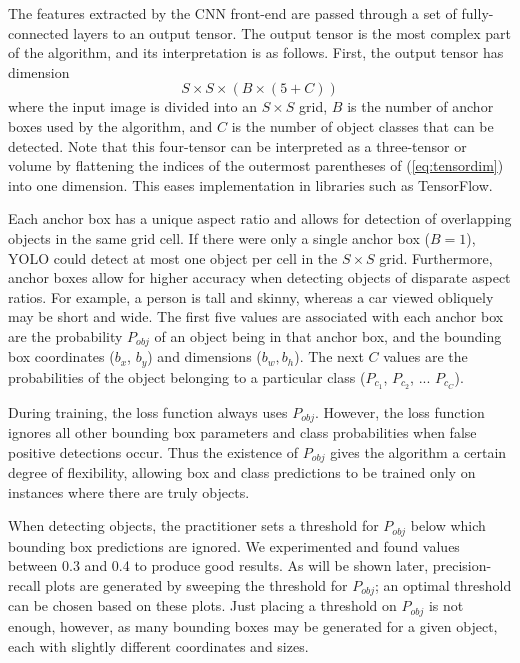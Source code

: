 \documentclass{article}
\begin{document}
The features extracted by the CNN front-end are passed through a set of fully-connected layers to an output tensor. The output tensor is the most complex part of the algorithm, and its interpretation is as follows. First, the output tensor has dimension
\begin{equation}
    S \times S \times (B \times (5 + C))
    \label{eq:tensordim}
\end{equation}
where the input image is divided into an $S \times S$ grid, $B$ is the number of anchor boxes used by the algorithm, and $C$ is the number of object classes that can be detected. Note that this four-tensor can be interpreted as a three-tensor or volume by flattening the indices of the outermost parentheses of (\ref{eq:tensordim}) into one dimension. This eases implementation in libraries such as TensorFlow.

Each anchor box has a unique aspect ratio and allows for detection of overlapping objects in the same grid cell. If there were only a single anchor box ($B=1$), YOLO could detect at most one object per cell in the $S \times S$ grid. Furthermore, anchor boxes allow for higher accuracy when detecting objects of disparate aspect ratios. For example, a person is tall and skinny, whereas a car viewed obliquely may be short and wide. The first five values are associated with each anchor box are the probability $P_{obj}$ of an object being in that anchor box, and the bounding box coordinates ($b_x$, $b_y$) and dimensions ($b_w, b_h$). The next $C$ values are the probabilities of the object belonging to a particular class ($P_{c_1}$, $P_{c_2}$, ... $P_{c_C}$).

During training, the loss function always uses $P_{obj}$. However, the loss function ignores all other bounding box parameters and class probabilities when false positive detections occur. Thus the existence of $P_{obj}$ gives the algorithm a certain degree of flexibility, allowing box and class predictions to be trained only on instances where there are truly objects.

When detecting objects, the practitioner sets a threshold for $P_{obj}$ below which bounding box predictions are ignored. We experimented and found values between 0.3 and 0.4 to produce good results. As will be shown later, precision-recall plots are generated by sweeping the threshold for $P_{obj}$; an optimal threshold can be chosen based on these plots. Just placing a threshold on $P_{obj}$ is not enough, however, as many bounding boxes may be generated for a given object, each with slightly different coordinates and sizes.
\end{document}
